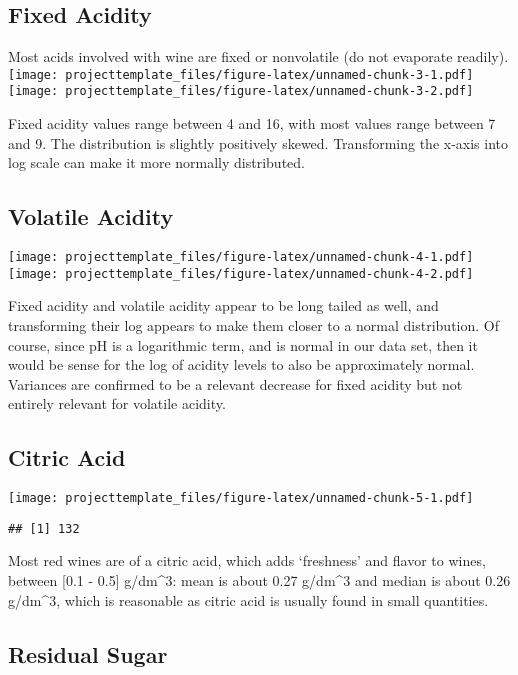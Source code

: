 \documentclass[]{article}
\begin{document}
\subsection{Fixed Acidity}\label{fixed-acidity}

Most acids involved with wine are fixed or nonvolatile (do not evaporate
readily).
\texttt{[image: projecttemplate\_files/figure-latex/unnamed-chunk-3-1.pdf]}
\texttt{[image: projecttemplate\_files/figure-latex/unnamed-chunk-3-2.pdf]}

Fixed acidity values range between 4 and 16, with most values range
between 7 and 9. The distribution is slightly positively skewed.
Transforming the x-axis into log scale can make it more normally
distributed.

\subsection{Volatile Acidity}\label{volatile-acidity}

\texttt{[image: projecttemplate\_files/figure-latex/unnamed-chunk-4-1.pdf]}
\texttt{[image: projecttemplate\_files/figure-latex/unnamed-chunk-4-2.pdf]}

Fixed acidity and volatile acidity appear to be long tailed as well, and
transforming their log appears to make them closer to a normal
distribution. Of course, since pH is a logarithmic term, and is normal
in our data set, then it would be sense for the log of acidity levels to
also be approximately normal. Variances are confirmed to be a relevant
decrease for fixed acidity but not entirely relevant for volatile
acidity.

\subsection{Citric Acid}\label{citric-acid}

\texttt{[image: projecttemplate\_files/figure-latex/unnamed-chunk-5-1.pdf]}

\begin{verbatim}
## [1] 132
\end{verbatim}

Most red wines are of a citric acid, which adds `freshness' and flavor
to wines, between {[}0.1 - 0.5{]} g/dm\^{}3: mean is about 0.27
g/dm\^{}3 and median is about 0.26 g/dm\^{}3, which is reasonable as
citric acid is usually found in small quantities.

\subsection{Residual Sugar}\label{residual-sugar}
\end{document}
